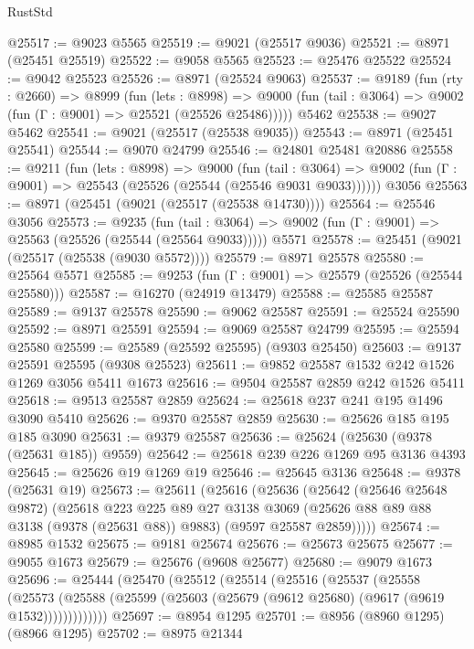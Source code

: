 \begin{lexlean}{RustStd}
\begin{coremodule}
@25517 := @9023 @5565
@25519 := @9021 (@25517 @9036)
@25521 := @8971 (@25451 @25519)
@25522 := @9058 @5565
@25523 := @25476 @25522
@25524 := @9042 @25523
@25526 := @8971 (@25524 @9063)
@25537 := @9189
    (fun (rty : @2660) =>
    @8999
      (fun (lets : @8998) =>
      @9000 (fun (tail : @3064) => @9002 (fun (Γ : @9001) => @25521 (@25526 @25486)))))
    @5462
@25538 := @9027 @5462
@25541 := @9021 (@25517 (@25538 @9035))
@25543 := @8971 (@25451 @25541)
@25544 := @9070 @24799
@25546 := @24801 @25481 @20886
@25558 := @9211
    (fun (lets : @8998) =>
    @9000
      (fun (tail : @3064) =>
      @9002 (fun (Γ : @9001) => @25543 (@25526 (@25544 (@25546 @9031 @9033))))))
    @3056
@25563 := @8971 (@25451 (@9021 (@25517 (@25538 @14730))))
@25564 := @25546 @3056
@25573 := @9235
    (fun (tail : @3064) => @9002 (fun (Γ : @9001) => @25563 (@25526 (@25544 (@25564 @9033)))))
    @5571
@25578 := @25451 (@9021 (@25517 (@25538 (@9030 @5572))))
@25579 := @8971 @25578
@25580 := @25564 @5571
@25585 := @9253 (fun (Γ : @9001) => @25579 (@25526 (@25544 @25580)))
@25587 := @16270 (@24919 @13479)
@25588 := @25585 @25587
@25589 := @9137 @25578
@25590 := @9062 @25587
@25591 := @25524 @25590
@25592 := @8971 @25591
@25594 := @9069 @25587 @24799
@25595 := @25594 @25580
@25599 := @25589 (@25592 @25595) (@9303 @25450)
@25603 := @9137 @25591 @25595 (@9308 @25523)
@25611 := @9852 @25587 @1532 @242 @1526 @1269 @3056 @5411 @1673
@25616 := @9504 @25587 @2859 @242 @1526 @5411
@25618 := @9513 @25587 @2859
@25624 := @25618 @237 @241 @195 @1496 @3090 @5410
@25626 := @9370 @25587 @2859
@25630 := @25626 @185 @195 @185 @3090
@25631 := @9379 @25587
@25636 := @25624 (@25630 (@9378 (@25631 @185)) @9559)
@25642 := @25618 @239 @226 @1269 @95 @3136 @4393
@25645 := @25626 @19 @1269 @19
@25646 := @25645 @3136
@25648 := @9378 (@25631 @19)
@25673 := @25611
    (@25616
      (@25636
        (@25642
          (@25646 @25648 @9872)
          (@25618
            @223
            @225
            @89
            @27
            @3138
            @3069
            (@25626 @88 @89 @88 @3138 (@9378 (@25631 @88)) @9883)
            (@9597 @25587 @2859)))))
@25674 := @8985 @1532
@25675 := @9181 @25674
@25676 := @25673 @25675
@25677 := @9055 @1673
@25679 := @25676 (@9608 @25677)
@25680 := @9079 @1673
@25696 := @25444
    (@25470
      (@25512
        (@25514
          (@25516
            (@25537
              (@25558
                (@25573
                  (@25588 (@25599 (@25603 (@25679 (@9612 @25680) (@9617 (@9619 @1532)))))))))))))
@25697 := @8954 @1295
@25701 := @8956 (@8960 @1295) (@8966 @1295)
@25702 := @8975 @21344

\end{coremodule}
\end{lexlean}
